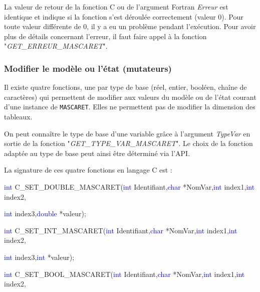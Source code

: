 \documentclass[a4paper,11pt]{article}
\begin{document}
\vspace{0.5cm}

 La valeur de retour de la fonction C ou de l'argument Fortran \textit{Erreur} est identique et indique si la fonction s'est d\'eroul\'ee correctement (valeur 0). Pour toute valeur diff\'erente de 0, il y a eu un probl\`eme pendant l'ex\'ecution. Pour avoir plus de d\'etails concernant l'erreur, il faut faire appel \`a la fonction "\textit{GET\_ERREUR\_MASCARET}".

\subsubsection{Modifier le mod\`ele ou l'\'etat (mutateurs)}

 \label{Mut}

 Il existe quatre fonctions, une par type de base (r\'eel, entier, bool\'een, cha\^ine de caract\`eres) qui permettent de modifier aux valeurs du mod\`ele ou de l'\'etat courant d'une instance de \texttt{MASCARET}. Elles ne permettent pas de modifier la dimension des tableaux.
 
 \vspace{0.5cm}
 
 On peut conna\^itre le type de base d'une variable gr\^ace \`a l'argument \textit{TypeVar} en sortie de la fonction "\textit{GET\_TYPE\_VAR\_MASCARET}". Le choix de la fonction adapt\'ee au type de base peut ainsi \^etre d\'etermin\'e via l'API.
 
 \vspace{0.5cm}
 
 La signature de ces quatre fonctions en langage C est :
 
  \vspace{0.5cm}
 
 \textcolor{blue}{int} C\_SET\_DOUBLE\_MASCARET(\textcolor{blue}{int} Identifiant,\textcolor{blue}{char} *NomVar,\textcolor{blue}{int} index1,\textcolor{blue}{int} index2,
 
 \textcolor{blue}{int} index3,\textcolor{blue}{double} *valeur);
 
 \textcolor{blue}{int} C\_SET\_INT\_MASCARET(\textcolor{blue}{int} Identifiant,\textcolor{blue}{char} *NomVar,\textcolor{blue}{int} index1,\textcolor{blue}{int} index2,
 
 \textcolor{blue}{int} index3,\textcolor{blue}{int} *valeur);
 
 \textcolor{blue}{int} C\_SET\_BOOL\_MASCARET(\textcolor{blue}{int} Identifiant,\textcolor{blue}{char} *NomVar,\textcolor{blue}{int} index1,\textcolor{blue}{int} index2,
 
\end{document}
